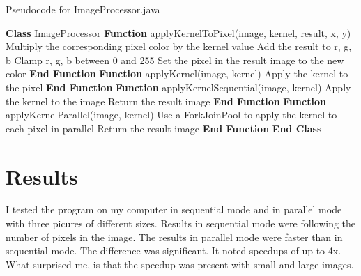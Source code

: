 \documentclass{article}
\begin{document}
\begin{multicols}{2}
    \begin{algorithm}[H]
        \caption{Pseudocode for ImageProcessor.java}
        \begin{algorithmic}[1]
            \State \textbf{Class} ImageProcessor
            \State \textbf{Function} applyKernelToPixel(image, kernel, result, x, y)
            \State Multiply the corresponding pixel color by the kernel value
            \State Add the result to r, g, b
            \EndFor
            \State Clamp r, g, b between 0 and 255
            \State Set the pixel in the result image to the new color
            \State \textbf{End Function}
            \State
            \State \textbf{Function} applyKernel(image, kernel)
            \State Apply the kernel to the pixel
            \EndFor
            \State \textbf{End Function}
            \State
            \State \textbf{Function} applyKernelSequential(image, kernel)
            \State Apply the kernel to the image
            \State Return the result image
            \State \textbf{End Function}
            \State
            \State \textbf{Function} applyKernelParallel(image, kernel)
            \State Use a ForkJoinPool to apply the kernel to each pixel in parallel
            \State Return the result image
            \State \textbf{End Function}
            \State \textbf{End Class}
        \end{algorithmic}
    \end{algorithm}

    \newpage

    \section{Results}

    I tested the program on my computer in sequential mode and in parallel mode with three picures of different sizes. Results in sequential mode were following the number of pixels in the image. The results in parallel mode were faster than in sequential mode. The difference was significant. It noted speedups of up to 4x. What surprised me, is that the speedup was present with small and large images.


\end{multicols}
\end{document}
